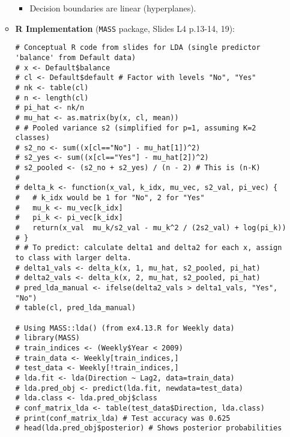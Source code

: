 \documentclass[12pt,a4paper]{article}
\newcommand{\Rpackage}[1]{\texttt{#1}} %
\begin{document}
\begin{itemize}
\begin{itemize}
\begin{itemize}
                    \item Decision boundaries are linear (hyperplanes).
                \end{itemize}
            \item \textbf{R Implementation} (\Rpackage{MASS} package, Slides L4 p.13-14, 19):
\begin{lstlisting}[caption={LDA on Default Data (Slides L4 p.13-14 conceptual, ex4.13.R actual)}]
# Conceptual R code from slides for LDA (single predictor 'balance' from Default data)
# x <- Default$balance
# cl <- Default$default # Factor with levels "No", "Yes"
# nk <- table(cl)
# n <- length(cl)
# pi_hat <- nk/n
# mu_hat <- as.matrix(by(x, cl, mean))
# # Pooled variance s2 (simplified for p=1, assuming K=2 classes)
# s2_no <- sum((x[cl=="No"] - mu_hat[1])^2)
# s2_yes <- sum((x[cl=="Yes"] - mu_hat[2])^2)
# s2_pooled <- (s2_no + s2_yes) / (n - 2) # This is (n-K)
# 
# delta_k <- function(x_val, k_idx, mu_vec, s2_val, pi_vec) {
#   # k_idx would be 1 for "No", 2 for "Yes"
#   mu_k <- mu_vec[k_idx]
#   pi_k <- pi_vec[k_idx]
#   return(x_val  mu_k/s2_val - mu_k^2 / (2s2_val) + log(pi_k))
# }
# # To predict: calculate delta1 and delta2 for each x, assign to class with larger delta.
# delta1_vals <- delta_k(x, 1, mu_hat, s2_pooled, pi_hat)
# delta2_vals <- delta_k(x, 2, mu_hat, s2_pooled, pi_hat)
# pred_lda_manual <- ifelse(delta2_vals > delta1_vals, "Yes", "No")
# table(cl, pred_lda_manual)

# Using MASS::lda() (from ex4.13.R for Weekly data)
# library(MASS)
# train_indices <- (Weekly$Year < 2009)
# train_data <- Weekly[train_indices,]
# test_data <- Weekly[!train_indices,]
# lda.fit <- lda(Direction ~ Lag2, data=train_data)
# lda.pred_obj <- predict(lda.fit, newdata=test_data)
# lda.class <- lda.pred_obj$class
# conf_matrix_lda <- table(test_data$Direction, lda.class)
# print(conf_matrix_lda) # Test accuracy was 0.625
# head(lda.pred_obj$posterior) # Shows posterior probabilities
\end{lstlisting}
        \end{itemize}


\end{itemize}
\end{document}
